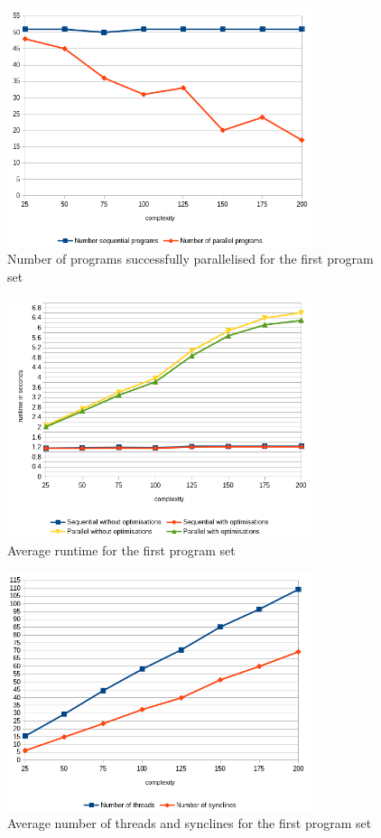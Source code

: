 \begin{figure}
    \centering
    \includegraphics[width=0.8\textwidth]{img/generated/par-success-1.png}
    \caption{\label{fig:gen-par-success-1}Number of programs successfully parallelised for the first program set}
\end{figure}
\begin{figure}
    \centering
    \includegraphics[width=0.8\textwidth]{img/generated/avg-runtime-1.png}
    \caption{\label{fig:gen-avg-runtime-1}Average runtime for the first program set}
\end{figure}
\begin{figure}
    \centering
    \includegraphics[width=0.8\textwidth]{img/generated/thread-count-1.png}
    \caption{\label{fig:gen-thread-count-1}Average number of threads and synclines for the first program set}
\end{figure}

